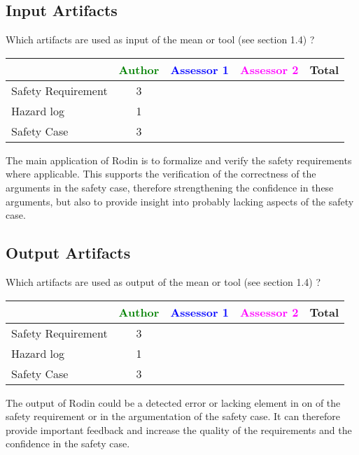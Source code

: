 \subsection{Input Artifacts}

Which artifacts are used as input of the mean or tool (see \citep{D4.2.a} section 1.4) ?


\begin{tabular}{|l | c | c | c | c|}
\hline
& \textcolor{green}{Author} & \textcolor{blue}{Assessor 1} & \textcolor{magenta}{Assessor 2} & Total \\
\hline
Safety Requirement & 3 & & &  \\
\hline
Hazard log & 1 & & & \\
\hline
Safety Case & 3 & & & \\
\hline
\end{tabular}

\begin{author_comment}
  The main application of Rodin is to formalize and verify the safety
  requirements where applicable. This supports the verification of the
  correctness of the arguments in the safety case, therefore strengthening the
  confidence in these arguments, but also to provide insight into probably
  lacking aspects of the safety case.
\end{author_comment}

\subsection{Output Artifacts}

Which artifacts are used as output of the mean or tool (see \citep{D4.2.a} section 1.4) ?


\begin{tabular}{|l | c | c | c | c|}
\hline
& \textcolor{green}{Author} & \textcolor{blue}{Assessor 1} & \textcolor{magenta}{Assessor 2} & Total \\
\hline
Safety Requirement & 3 & & &  \\
\hline
Hazard log & 1 & & & \\
\hline
Safety Case & 3 & & & \\
\hline
\end{tabular}

\begin{author_comment}
  The output of Rodin could be a detected error or lacking element in on of the
  safety requirement or in the argumentation of the safety case. It can
  therefore provide important feedback and increase the quality of the
  requirements and the confidence in the safety case.
\end{author_comment}

